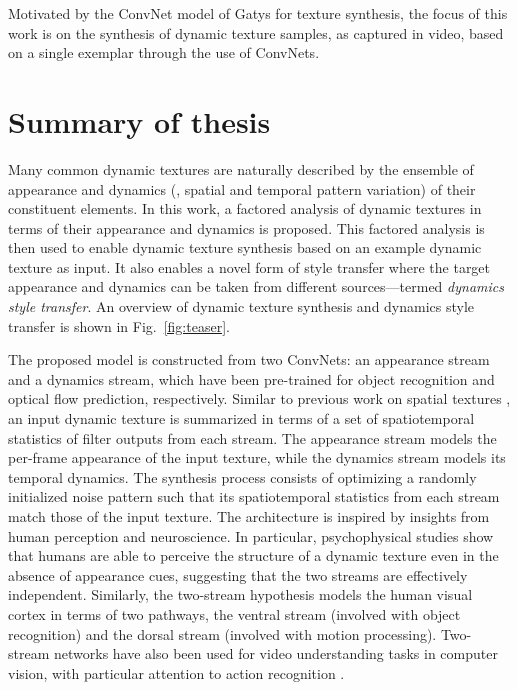 Motivated by the ConvNet model of Gatys \etal \cite{gatys2016image} for texture synthesis, the focus of this work is on the synthesis of dynamic texture 
samples, as captured in video, based on a single exemplar through the use of ConvNets.
\clearpage

\clearpage

\section{Summary of thesis}

Many common dynamic textures are naturally described by the ensemble of 
appearance and dynamics (\ie, spatial and temporal pattern variation) of their 
constituent elements. In this work, a factored analysis of dynamic 
textures in terms of their appearance and dynamics is proposed.
This factored analysis is then used to enable dynamic texture synthesis
based on an example dynamic texture as input.
It also enables a novel form of style transfer where the 
target appearance and dynamics can be taken from different sources---termed \emph{dynamics style transfer}.
An overview of dynamic texture synthesis and dynamics style transfer
is shown in Fig.\ \ref{fig:teaser}.

The proposed model is constructed from two ConvNets: an appearance stream and a dynamics stream,
which have been pre-trained for object recognition
and optical flow prediction, respectively.
Similar to previous work on spatial textures
\cite{gatys2015,heeger1995pyramid,portilla2000parametric}, an input dynamic texture is summarized in terms of a set of
spatiotemporal statistics of filter outputs from each stream.
The appearance stream models the per-frame appearance of
the input texture, while the dynamics stream models its
temporal dynamics.
The synthesis process consists of optimizing a randomly initialized noise pattern such that its spatiotemporal statistics from
each stream match those of the input texture.
The architecture is inspired by insights from human perception and 
neuroscience.
In particular, psychophysical studies \cite{cutting1982} show that
humans are able to perceive the structure of a dynamic texture even
in the absence of appearance cues, suggesting that the two streams
are effectively independent.
Similarly, the two-stream hypothesis \cite{goodale1992} models the 
human visual cortex in terms of two pathways, the ventral stream
(involved with object recognition) and the
dorsal stream (involved with motion processing). Two-stream networks have also been used for video understanding tasks in computer vision, with particular attention to action recognition \cite{simonyan2014,feichtenhofer2016two}.

